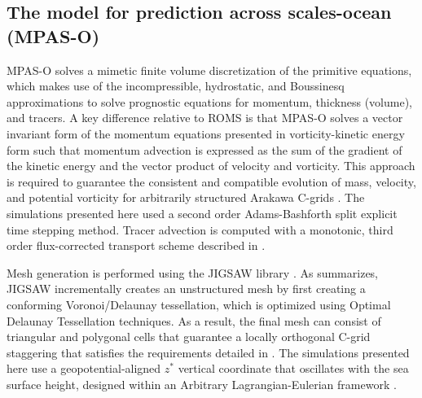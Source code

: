 \subsection{The model for prediction across scales-ocean (MPAS-O)}
MPAS-O solves a mimetic finite volume discretization of the primitive equations, which makes use of the incompressible, hydrostatic, and Boussinesq approximations to solve prognostic equations for momentum, thickness (volume), and tracers. A key difference relative to ROMS is that MPAS-O solves a vector invariant form of the momentum equations presented in vorticity-kinetic energy form such that momentum advection is expressed as the sum of the gradient of the kinetic energy and the vector product of velocity and vorticity. This approach is required to guarantee the consistent and compatible evolution of mass, velocity, and potential vorticity for arbitrarily structured Arakawa C-grids \citep{Arakawa_1977, ringler2010unified}. The simulations presented here used a second order Adams-Bashforth split explicit time stepping method. Tracer advection is computed with a monotonic, third order flux-corrected transport scheme described in \cite{skamarock2011conservative}. 

Mesh generation is performed using the JIGSAW library \citep{engwirda2017jigsaw}. As \cite{hoch2020mpas} summarizes, JIGSAW incrementally creates an unstructured mesh by first creating a conforming Voronoi/Delaunay tessellation, which is optimized using Optimal Delaunay Tessellation techniques. As a result, the final mesh can consist of triangular and polygonal cells that guarantee a locally orthogonal C-grid staggering that satisfies the requirements detailed in \cite{ringler2010unified}. The simulations presented here use a geopotential-aligned $z^*$ vertical coordinate that oscillates with the sea surface height, designed within an Arbitrary Lagrangian-Eulerian framework \citep{Petersen_2015, griffies2020primer}. 

